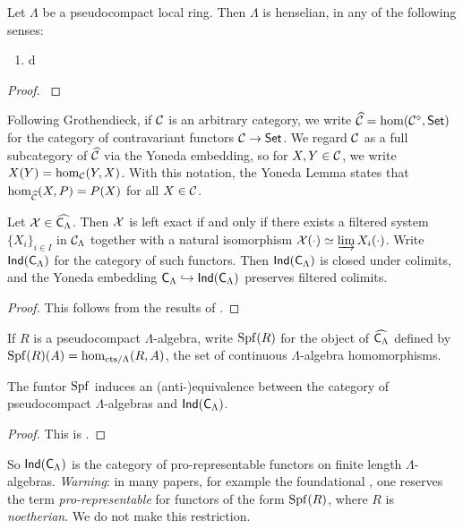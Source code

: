 \documentclass[phd,cornellheadings,draft]{cornell}
\begin{document}
\begin{lemma}
Let $\Lambda$ be a pseudocompact local ring. Then $\Lambda$ is henselian, in 
any of the following senses:
\begin{enumerate}
\item
d
\end{enumerate}
\end{lemma}
\begin{proof}
\cite[18.5.?]{ega4-4}
\end{proof}

Following Grothendieck, if $\mathcal{C}$ is an arbitrary category, we write 
$\widehat{\mathcal{C}}=\hom(\mathcal{C}^\circ,\mathsf{Set})$ for the category of contravariant functors 
$\mathcal{C}\to \mathsf{Set}$. We regard $\mathcal{C}$ as a full subcategory of $\widehat{\mathcal{C}}$ via the 
Yoneda embedding, so for $X,Y\in \mathcal{C}$, we write $X(Y) = \hom_{\mathcal{C}}(Y,X)$. With 
this notation, the Yoneda Lemma states that $\hom_{\widehat{\mathcal{C}}}(X,P) = P(X)$ 
for all $X\in \mathcal{C}$. 

\begin{lemma}\label{thm:ind-object-def}
Let $\mathcal{X}\in\widehat{\mathsf{C}_\Lambda}$. Then $\mathcal{X}$ is left exact if and only 
if there exists a filtered system $\{X_i\}_{i\in I}$ in $\mathcal{C}_\Lambda$ together 
with a natural isomorphism $\mathcal{X}(\cdot)\simeq \varinjlim X_i(\cdot)$. Write 
$\operatorname{\mathsf{Ind}}(\mathsf{C}_\Lambda)$ for the category of such functors. Then 
$\operatorname{\mathsf{Ind}}(\mathsf{C}_\Lambda)$ is closed under colimits, and the 
Yoneda embedding $\mathsf{C}_\Lambda\hookrightarrow\operatorname{\mathsf{Ind}}(\mathsf{C}_\Lambda)$ 
preserves filtered colimits.
\end{lemma}
\begin{proof}
This follows from the results of \cite[6.1]{kashiwara-schapira-2006}. 
\end{proof}

If $R$ is a pseudocompact $\Lambda$-algebra, write $\operatorname{Spf}(R)$ for the object of 
$\widehat{\mathsf{C}_\Lambda}$ defined by $\operatorname{Spf}(R)(A)=\hom_{\mathrm{cts}/\Lambda}(R,A)$, 
the set of continuous $\Lambda$-algebra homomorphisms. 

\begin{lemma}
The funtor $\operatorname{Spf}$ induces an (anti-)equivalence between the category of 
pseudocompact $\Lambda$-algebras and $\operatorname{\mathsf{Ind}}(\mathsf{C}_\Lambda)$. 
\end{lemma}
\begin{proof}
This is \cite[VII\textsubscript{B} 0.4.2 Prop.]{sga3-1}. 
\end{proof}

So $\operatorname{\mathsf{Ind}}(\mathsf{C}_\Lambda)$ is the category of pro-representable 
functors on finite length $\Lambda$-algebras. \emph{Warning}: in many papers, 
for example the foundational \cite{mazur-1995}, one reserves the term 
\emph{pro-representable} for functors of the form $\operatorname{Spf}(R)$, where $R$ is 
\emph{noetherian}. We do not make this restriction. 
\end{document}
